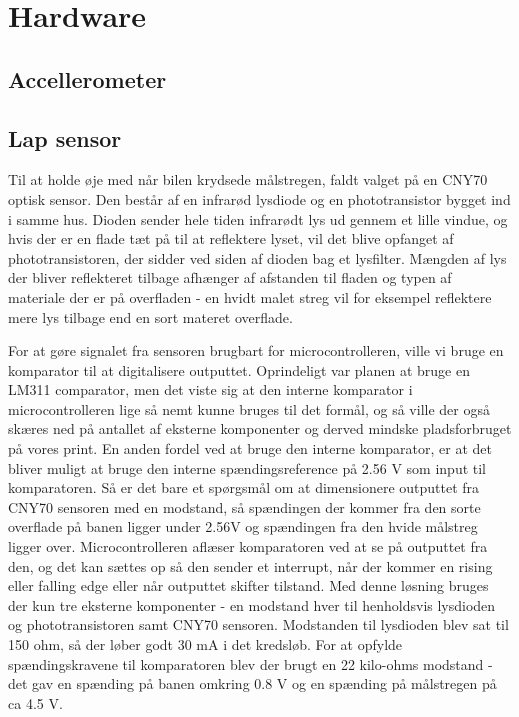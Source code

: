 \section{Hardware}

\subsection{Accellerometer}

\subsection{Lap sensor}

Til at holde øje med når bilen krydsede målstregen, faldt valget på en CNY70 optisk sensor. Den består af en infrarød lysdiode og en phototransistor bygget ind i samme hus. Dioden sender hele tiden infrarødt lys ud gennem et lille vindue, og hvis der er en flade tæt på til at reflektere lyset, vil det blive opfanget af phototransistoren, der sidder ved siden af dioden bag et lysfilter. Mængden af lys der bliver reflekteret tilbage afhænger af afstanden til fladen og typen af materiale der er på overfladen - en hvidt malet streg vil for eksempel reflektere mere lys tilbage end en sort materet overflade.

For at gøre signalet fra sensoren brugbart for microcontrolleren, ville vi bruge en komparator til at digitalisere outputtet. Oprindeligt var planen at bruge en LM311 comparator, men det viste sig at den interne komparator i microcontrolleren lige så nemt kunne bruges til det formål, og så ville der også skæres ned på antallet af eksterne komponenter og derved mindske pladsforbruget på vores print. En anden fordel ved at bruge den interne komparator, er at det bliver muligt at bruge den interne spændingsreference på 2.56 V som input til komparatoren. Så er det bare et spørgsmål om at dimensionere outputtet fra CNY70 sensoren med en modstand, så spændingen der kommer fra den sorte overflade på banen ligger under 2.56V og spændingen fra den hvide målstreg ligger over. Microcontrolleren aflæser komparatoren ved at se på outputtet fra den, og det kan sættes op så den sender et interrupt, når der kommer en rising eller falling edge eller når outputtet skifter tilstand. Med denne løsning bruges der kun tre eksterne komponenter - en modstand hver til henholdsvis lysdioden og phototransistoren samt CNY70 sensoren. Modstanden til lysdioden blev sat til 150 ohm, så der løber godt 30 mA i det kredsløb. For at opfylde spændingskravene til komparatoren blev der brugt en 22 kilo-ohms modstand - det gav en spænding på banen omkring 0.8 V og en spænding på målstregen på ca 4.5 V.

